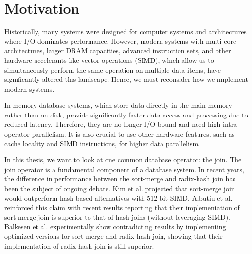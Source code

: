 \section{Motivation}
\label{sec:motivation}

Historically, many systems were designed for computer systems and architectures where I/O dominates
performance. However, modern systems with multi-core architectures, larger DRAM capacities,
advanced instruction sets, and other hardware accelerants like vector operations (SIMD), which allow us 
to simultaneously perform the same operation on multiple data items, have significantly altered this
landscape. Hence, we must reconsider how we implement modern systems.

In-memory database systems, which store data directly in the main memory rather than on disk,
provide significantly faster data access and processing due to reduced latency.
Therefore, they are no longer I/O bound and need high intra-operator
parallelism. It is also crucial to use other hardware features, such as cache locality and SIMD 
instructions, for higher data parallelism.

In this thesis, we want to look at one common database operator: the join.
The join operator is a fundamental component of a database system.
In recent years, the difference in performance between the sort-merge and radix-hash join has been
the subject of ongoing debate. Kim et al. \cite{10.14778/1687553.1687564} projected that sort-merge 
join would outperform hash-based
alternatives with 512-bit SIMD. Albutiu et al. \cite{MPSM} reinforced this claim with recent results reporting that
their implementation of sort-merge join is superior to that of hash joins (without
leveraging SIMD). Balkesen et al. \cite{Balkesen} experimentally show contradicting results by implementing 
optimized versions for sort-merge and radix-hash join, showing that their implementation of
radix-hash join is still superior.


